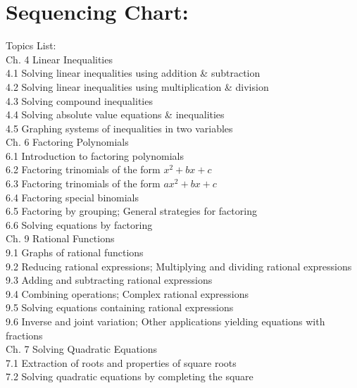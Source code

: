 \documentclass{ximera}
\begin{document}
\section*{Sequencing Chart:}
Topics List:\\
Ch. 4 Linear Inequalities\\
4.1 Solving linear inequalities using addition \& subtraction\\
4.2 Solving linear inequalities using multiplication \& division\\
4.3 Solving compound inequalities\\
4.4 Solving absolute value equations \& inequalities\\
4.5 Graphing systems of inequalities in two variables\\
Ch. 6 Factoring Polynomials\\
6.1 Introduction to factoring polynomials\\
6.2 Factoring trinomials of the form $x^{2}+b x+c$\\
6.3 Factoring trinomials of the form $a x^{2}+b x+c$\\
6.4 Factoring special binomials\\
6.5 Factoring by grouping; General strategies for factoring\\
6.6 Solving equations by factoring\\
Ch. 9 Rational Functions\\
9.1 Graphs of rational functions\\
9.2 Reducing rational expressions; Multiplying and dividing rational expressions\\
9.3 Adding and subtracting rational expressions\\
9.4 Combining operations; Complex rational expressions\\
9.5 Solving equations containing rational expressions\\
9.6 Inverse and joint variation; Other applications yielding equations with fractions\\
Ch. 7 Solving Quadratic Equations\\
7.1 Extraction of roots and properties of square roots\\
7.2 Solving quadratic equations by completing the square\\
\end{document}
